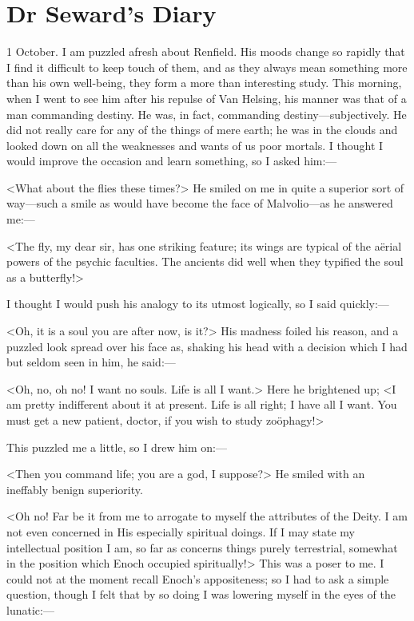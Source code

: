 \section{Dr Seward's Diary}

\begin{diary}{1 October.}
I am puzzled afresh about Renfield. His moods change so rapidly that I find it difficult to keep touch of them, and as they always mean something more than his own well-being, they form a more than interesting study. This morning, when I went to see him after his repulse of Van Helsing, his manner was that of a man commanding destiny. He was, in fact, commanding destiny—subjectively. He did not really care for any of the things of mere earth; he was in the clouds and looked down on all the weaknesses and wants of us poor mortals. I thought I would improve the occasion and learn something, so I asked him:—

<What about the flies these times?> He smiled on me in quite a superior sort of way—such a smile as would have become the face of Malvolio—as he answered me:—

<The fly, my dear sir, has one striking feature; its wings are typical of the aërial powers of the psychic faculties. The ancients did well when they typified the soul as a butterfly!>

I thought I would push his analogy to its utmost logically, so I said quickly:—

<Oh, it is a soul you are after now, is it?> His madness foiled his reason, and a puzzled look spread over his face as, shaking his head with a decision which I had but seldom seen in him, he said:—

<Oh, no, oh no! I want no souls. Life is all I want.> Here he brightened up; <I am pretty indifferent about it at present. Life is all right; I have all I want. You must get a new patient, doctor, if you wish to study zoöphagy!>

This puzzled me a little, so I drew him on:—

<Then you command life; you are a god, I suppose?> He smiled with an ineffably benign superiority.

<Oh no! Far be it from me to arrogate to myself the attributes of the Deity. I am not even concerned in His especially spiritual doings. If I may state my intellectual position I am, so far as concerns things purely terrestrial, somewhat in the position which Enoch occupied spiritually!> This was a poser to me. I could not at the moment recall Enoch's appositeness; so I had to ask a simple question, though I felt that by so doing I was lowering myself in the eyes of the lunatic:—


\end{diary}
